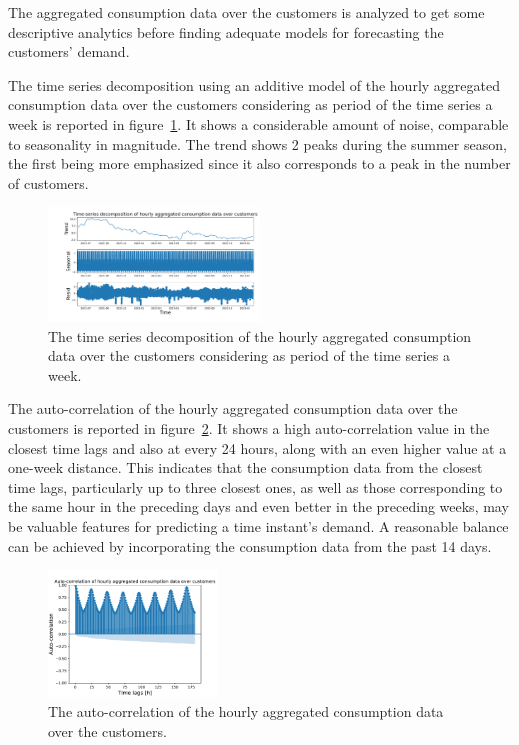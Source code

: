 The aggregated consumption data over the customers is analyzed to get some descriptive analytics before finding adequate models for forecasting the customers' demand.

The time series decomposition using an additive model of the hourly aggregated consumption data over the customers considering as period of the time series a week is reported in figure~\ref{fig:demanddecomposition}.
It shows a considerable amount of noise, comparable to seasonality in magnitude.
The trend shows 2 peaks during the summer season, the first being more emphasized since it also corresponds to a peak in the number of customers.

\begin{figure}[H]
\centering
\includegraphics[width=0.5\textwidth]{images/demand/hourly_decomposition_week_period}
\caption{The time series decomposition of the hourly aggregated consumption data over the customers considering as period of the time series a week.}
\label{fig:demanddecomposition}
\end{figure}

The auto-correlation of the hourly aggregated consumption data over the customers is reported in figure~\ref{fig:demandcorrelation}.
It shows a high auto-correlation value in the closest time lags and also at every 24 hours, along with an even higher value at a one-week distance.
This indicates that the consumption data from the closest time lags, particularly up to three closest ones, as well as those corresponding to the same hour in the preceding days and even better in the preceding weeks, may be valuable features for predicting a time instant's demand.
A reasonable balance can be achieved by incorporating the consumption data from the past 14 days.

\begin{figure}[H]
\centering
\includegraphics[width=0.4\textwidth]{images/demand/hourly_correlation_week_range}
\caption{The auto-correlation of the hourly aggregated consumption data over the customers.}
\label{fig:demandcorrelation}
\end{figure}

